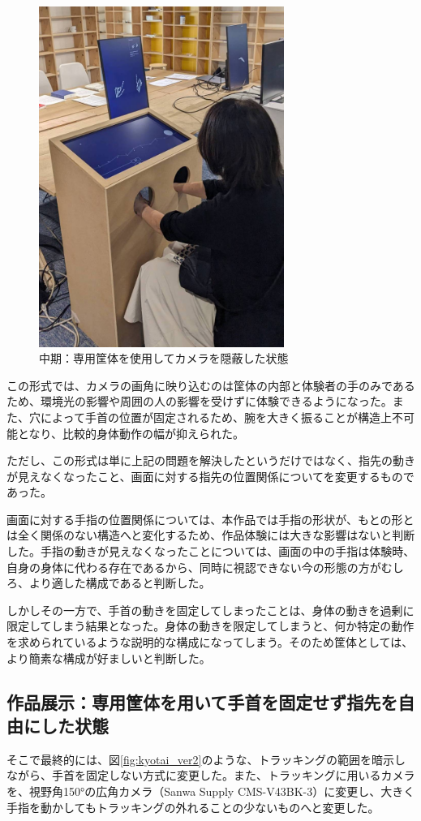 \begin{figure}[H]
  \centering
  \includegraphics[width=8cm]{img/kyotai_ver1.jpg}
  \caption{中期：専用筐体を使用してカメラを隠蔽した状態}
  \label{fig:kyotai_ver1}
\end{figure}

この形式では、カメラの画角に映り込むのは筐体の内部と体験者の手のみであるため、環境光の影響や周囲の人の影響を受けずに体験できるようになった。また、穴によって手首の位置が固定されるため、腕を大きく振ることが構造上不可能となり、比較的身体動作の幅が抑えられた。

ただし、この形式は単に上記の問題を解決したというだけではなく、指先の動きが見えなくなったこと、画面に対する指先の位置関係についてを変更するものであった。

画面に対する手指の位置関係については、本作品では手指の形状が、もとの形とは全く関係のない構造へと変化するため、作品体験には大きな影響はないと判断した。手指の動きが見えなくなったことについては、画面の中の手指は体験時、自身の身体に代わる存在であるから、同時に視認できない今の形態の方がむしろ、より適した構成であると判断した。

しかしその一方で、手首の動きを固定してしまったことは、身体の動きを過剰に限定してしまう結果となった。身体の動きを限定してしまうと、何か特定の動作を求められているような説明的な構成になってしまう。そのため筐体としては、より簡素な構成が好ましいと判断した。


\subsection{作品展示：専用筐体を用いて手首を固定せず指先を自由にした状態}
そこで最終的には、図\ref{fig:kyotai_ver2}のような、トラッキングの範囲を暗示しながら、手首を固定しない方式に変更した。また、トラッキングに用いるカメラを、視野角150°の広角カメラ（Sanwa Supply CMS-V43BK-3）に変更し、大きく手指を動かしてもトラッキングの外れることの少ないものへと変更した。

